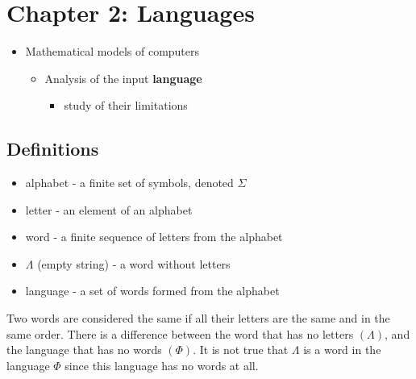 \section{Chapter 2: Languages}

\begin{itemize}
    \item Mathematical models of computers
    \begin{itemize}
        \item Analysis of the input \textbf{language}
        \begin{itemize}
            \item study of their limitations
        \end{itemize}
    \end{itemize}
\end{itemize}

\subsection{Definitions}
\begin{itemize}
    \item alphabet - a finite set of symbols, denoted $\Sigma$
    \item letter - an element of an alphabet
    \item word - a finite sequence of letters from the alphabet
    \item $\Lambda$ (empty string) - a word without letters
    \item language - a set of words formed from the alphabet
\end{itemize}

Two words are considered the same if all their letters are the same and in the same order.
There is a difference between the word that has no letters $(\Lambda)$, and the language that has no words $(\Phi)$.
It is not true that $\Lambda$ is a word in the language $\Phi$ since this language has no words at all.

